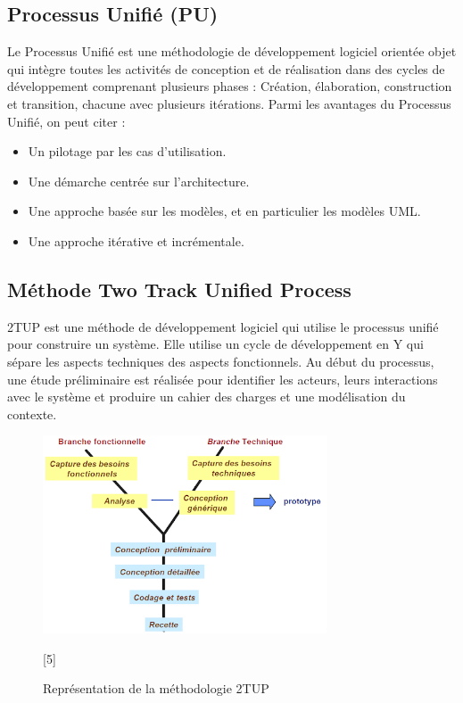 \subsection{Processus Unifié (PU)}
Le Processus Unifié est une méthodologie de développement logiciel orientée objet qui intègre toutes les activités de conception et de réalisation dans des cycles de développement comprenant plusieurs phases : Création, élaboration, construction et transition, chacune avec plusieurs itérations.
Parmi les avantages du Processus Unifié, on peut citer :
\begin{itemize}[itemsep=2pt, parsep=2pt]
    \item Un pilotage par les cas d’utilisation.
    \item Une démarche centrée sur l’architecture.
    \item Une approche basée sur les modèles, et en particulier les modèles UML.
    \item Une approche itérative et incrémentale.
\end{itemize}

\subsection{Méthode Two Track Unified Process}
2TUP est une méthode de développement logiciel qui utilise le processus unifié pour construire un système. Elle utilise un cycle de développement en Y qui sépare les aspects techniques des aspects fonctionnels. Au début du processus, une étude préliminaire est réalisée pour identifier les acteurs, leurs interactions avec le système et produire un cahier des charges et une modélisation du contexte.

\begin{figure}[H]
    \centering
    \includegraphics[width=0.75\textwidth,height=0.65\textwidth]{images/chapitre-1/2tup.png}
    \caption{Représentation de la méthodologie 2TUP}[5]
    \label{fig:2tup-image}    
\end{figure}

